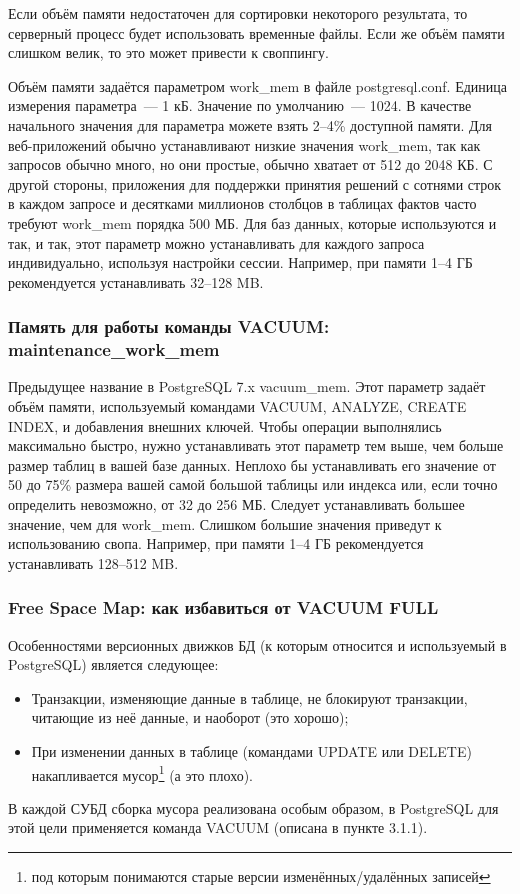 Если объём памяти недостаточен для сортировки некоторого результата, то серверный процесс будет использовать
временные файлы. Если же объём памяти слишком велик, то это может привести к своппингу.

Объём памяти задаётся параметром work\_mem в файле postgresql.conf. Единица измерения параметра~--- 1 кБ.
Значение по умолчанию~--- 1024. В качестве начального значения для параметра можете взять 2--4\% доступной памяти.
Для веб-приложений обычно устанавливают низкие значения work\_mem, так как запросов обычно много, но они простые, обычно хватает
от 512 до 2048 КБ. С другой стороны, приложения для поддержки принятия решений с сотнями строк в каждом запросе и десятками
миллионов столбцов  в таблицах фактов часто требуют work\_mem порядка 500 МБ. Для баз данных, которые используются и так, и так,
этот параметр можно устанавливать для каждого запроса индивидуально, используя настройки сессии. Например,
при памяти 1--4 ГБ рекомендуется устанавливать 32--128 MB.

\subsubsection{Память для работы команды VACUUM: maintenance\_work\_mem}
Предыдущее название в PostgreSQL 7.x vacuum\_mem. Этот параметр задаёт объём памяти, используемый командами
VACUUM, ANALYZE, CREATE INDEX, и добавления внешних ключей.
Чтобы операции выполнялись максимально быстро, нужно устанавливать этот параметр тем выше, чем больше размер таблиц в
вашей базе данных. Неплохо бы устанавливать его значение от 50 до 75\% размера вашей самой большой таблицы или индекса или,
если точно определить невозможно, от 32 до 256 МБ. Следует устанавливать большее значение, чем для work\_mem.
Слишком большие значения приведут к использованию свопа. Например, при памяти 1--4 ГБ рекомендуется устанавливать 128--512 MB.

\subsubsection{Free Space Map: как избавиться от VACUUM FULL}
Особенностями версионных движков БД (к которым относится и используемый в PostgreSQL) является следующее:
\begin{itemize}
\item Транзакции, изменяющие данные в таблице, не блокируют транзакции, читающие из неё данные, и наоборот (это хорошо);
\item При изменении данных в таблице (командами UPDATE или DELETE) накапливается мусор\footnote{под которым понимаются
старые версии изменённых/удалённых записей} (а это плохо).
\end{itemize}
В каждой СУБД сборка мусора реализована особым образом, в PostgreSQL для этой цели применяется команда VACUUM (описана в пункте 3.1.1).

